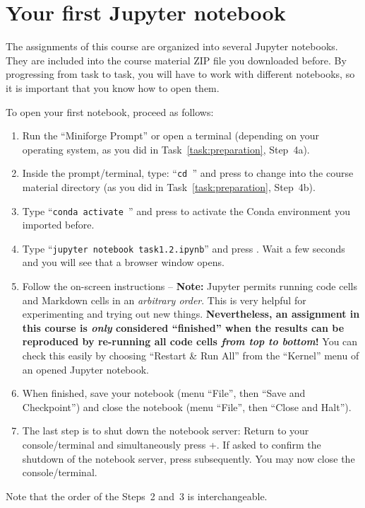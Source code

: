 \documentclass[12pt,a4paper]{article}
\begin{document}
\section{Your first Jupyter notebook}
The assignments of this course are organized into several Jupyter notebooks. They are included into the course material ZIP file you downloaded before. By progressing from task to task, you will have to work with different notebooks, so it is important that you know how to open them.

To open your first notebook, proceed as follows:
\begin{enumerate}
    \item Run the ``Miniforge Prompt'' or open a terminal (depending on your operating system, as you did in Task~\ref{task:preparation}, Step~4a).
    \item Inside the prompt/terminal, type: ``\texttt{cd {\projectid}}'' and press \Return to change into the course material directory (as you did in Task~\ref{task:preparation}, Step~4b).
    \item Type ``\texttt{conda activate {\projectid}}'' and press \Return to activate the Conda environment you imported before.
    \item Type ``\texttt{jupyter notebook task1.2.ipynb}'' and press \Return. Wait a few seconds and you will see that a browser window opens.
    \item Follow the on-screen instructions -- \textbf{Note:} Jupyter permits running code cells and Markdown cells in an \emph{arbitrary order}. This is very helpful for experimenting and trying out new things. \textbf{Nevertheless, an assignment in this course is \emph{only} considered ``finished'' when the results can be reproduced by re-running all code cells \emph{from top to bottom}!} You can check this easily by choosing ``Restart \& Run All'' from the ``Kernel'' menu of an opened Jupyter notebook.
    \item When finished, save your notebook (menu ``File'', then ``Save and Checkpoint'') and close the notebook (menu ``File'', then ``Close and Halt'').
    \item The last step is to shut down the notebook server: Return to your console/terminal and simultaneously press \Ctrl+. If asked to confirm the shutdown of the notebook server, press \Return subsequently. You may now close the console/terminal.
\end{enumerate}
Note that the order of the Steps~2 and~3 is interchangeable.
\end{document}
